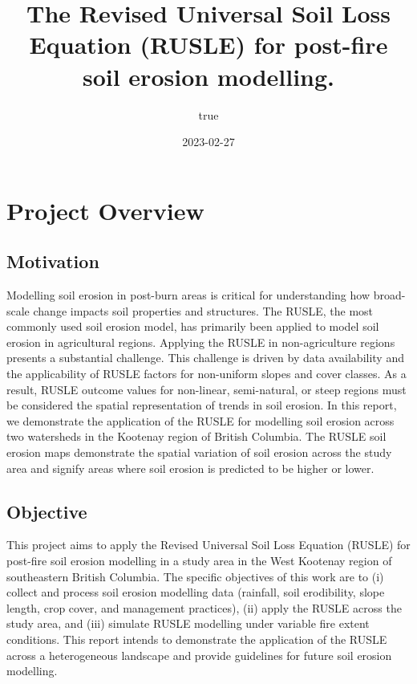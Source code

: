 \documentclass[
]{article}
\title{The Revised Universal Soil Loss Equation (RUSLE) for post-fire soil erosion modelling.}
\author{true}
\date{2023-02-27}
\begin{document}
\maketitle

{
\setcounter{tocdepth}{2}
\tableofcontents
}
\hypertarget{overview}{%
\section*{Project Overview}\label{overview}}

\hypertarget{motivation}{%
\subsection*{Motivation}\label{motivation}}

Modelling soil erosion in post-burn areas is critical for understanding how broad-scale change impacts soil properties and structures. The RUSLE, the most commonly used soil erosion model, has primarily been applied to model soil erosion in agricultural regions. Applying the RUSLE in non-agriculture regions presents a substantial challenge. This challenge is driven by data availability and the applicability of RUSLE factors for non-uniform slopes and cover classes. As a result, RUSLE outcome values for non-linear, semi-natural, or steep regions must be considered the spatial representation of trends in soil erosion. In this report, we demonstrate the application of the RUSLE for modelling soil erosion across two watersheds in the Kootenay region of British Columbia. The RUSLE soil erosion maps demonstrate the spatial variation of soil erosion across the study area and signify areas where soil erosion is predicted to be higher or lower.

\hypertarget{objective}{%
\subsection*{Objective}\label{objective}}

This project aims to apply the Revised Universal Soil Loss Equation (RUSLE) for post-fire soil erosion modelling in a study area in the West Kootenay region of southeastern British Columbia. The specific objectives of this work are to (i) collect and process soil erosion modelling data (rainfall, soil erodibility, slope length, crop cover, and management practices), (ii) apply the RUSLE across the study area, and (iii) simulate RUSLE modelling under variable fire extent conditions. This report intends to demonstrate the application of the RUSLE across a heterogeneous landscape and provide guidelines for future soil erosion modelling.
\end{document}
